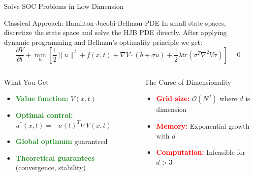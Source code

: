 \documentclass[aspectratio=169,xcolor=dvipsnames]{beamer}
\begin{document}
\begin{frame}{Solve SOC Problems in Low Dimension}
    \vspace{-0.1cm}
    
    \begin{block}{Classical Approach: Hamilton-Jacobi-Bellman PDE}
        In small state spaces, discretize the state space and solve the HJB PDE directly. After applying dynamic programming and Bellman's optimality principle we get:
        \begin{equation}
        \frac{\partial V}{\partial t} + \min_u \left[ \frac{1}{2}\|u\|^2 + f(x,t) + \nabla V \cdot (b + \sigma u) + \frac{1}{2}\lambda \text{tr}(\sigma^T \nabla^2 V \sigma) \right] = 0
        \end{equation}
    \end{block}

    \vspace{-0.4cm}
    
    \begin{columns}[t]
        \begin{block}{What You Get}
            \begin{itemize}
                \item \textcolor{ForestGreen}{\textbf{Value function:}} $V(x,t)$
                \item \textcolor{ForestGreen}{\textbf{Optimal control:}} $u^*(x,t) = -\sigma(t)^T \nabla V(x,t)$
                \item \textcolor{ForestGreen}{\textbf{Global optimum}} guaranteed
                \item \textcolor{ForestGreen}{\textbf{Theoretical guarantees}} (convergence, stability)
            \end{itemize}
        \end{block}
        
        \begin{alertblock}{The Curse of Dimensionality}
            \begin{itemize}
                \item \textcolor{red}{\textbf{Grid size:}} $\mathcal{O}(N^d)$ where $d$ is dimension
                \item \textcolor{red}{\textbf{Memory:}} Exponential growth with $d$
                \item \textcolor{red}{\textbf{Computation:}} Infeasible for $d > 3$
            \end{itemize}
        \end{alertblock}
    \end{columns}


\end{frame}
\end{document}
